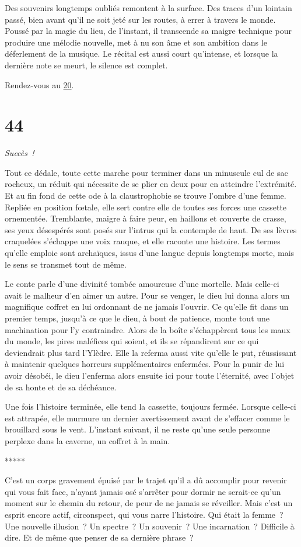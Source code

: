 \documentclass{report}
\newcommand{\gsection}[1]{
    \section{#1}
    \label{section-#1}
}
\newcommand{\glink}[1]{\hyperref[section-#1]{#1}}
\newcommand{\ellipse}{
    \begin{center}
        *****
    \end{center}
}
\newcommand{\success}{
    \emph{Succès !}
}
\begin{document}
Des souvenirs longtemps oubliés remontent à la surface. Des traces d'un lointain passé, bien avant qu'il ne soit jeté sur les routes, à errer à travers le monde. Poussé par la magie du lieu, de l'instant, il transcende sa maigre technique pour produire une mélodie nouvelle, met à nu son âme et son ambition dans le déferlement de la musique. Le récital est aussi court qu'intense, et lorsque la dernière note se meurt, le silence est complet.

Rendez-vous au \glink{20}.

\gsection{44}

\success

Tout ce dédale, toute cette marche pour terminer dans un minuscule cul de sac rocheux, un réduit qui nécessite de se plier en deux pour en atteindre l'extrémité. Et au fin fond de cette ode à la claustrophobie se trouve l'ombre d'une femme. Repliée en position fœtale, elle sert contre elle de toutes ses forces une cassette ornementée. Tremblante, maigre à faire peur, en haillons et couverte de crasse, ses yeux désespérés sont posés sur l'intrus qui la contemple de haut. De ses lèvres craquelées s'échappe une voix rauque, et elle raconte une histoire. Les termes qu'elle emploie sont archaïques, issus d'une langue depuis longtemps morte, mais le sens se transmet tout de même.

Le conte parle d'une divinité tombée amoureuse d'une mortelle. Mais celle-ci avait le malheur d'en aimer un autre. Pour se venger, le dieu lui donna alors un magnifique coffret en lui ordonnant de ne jamais l'ouvrir. Ce qu'elle fit dans un premier temps, jusqu'à ce que le dieu, à bout de patience, monte tout une machination pour l'y contraindre. Alors de la boîte s'échappèrent tous les maux du monde, les pires maléfices qui soient, et ils se répandirent sur ce qui deviendrait plus tard l'Ylèdre. Elle la referma aussi vite qu'elle le put, réussissant à maintenir quelques horreurs supplémentaires enfermées. Pour la punir de lui avoir désobéi, le dieu l'enferma alors ensuite ici pour toute l'éternité, avec l'objet de sa honte et de sa déchéance.

Une fois l'histoire terminée, elle tend la cassette, toujours fermée. Lorsque celle-ci est attrapée, elle murmure un dernier avertissement avant de s'effacer comme le brouillard sous le vent. L'instant suivant, il ne reste qu'une seule personne perplexe dans la caverne, un coffret à la main.

\ellipse

C'est un corps gravement épuisé par le trajet qu'il a dû accomplir pour revenir qui vous fait face, n'ayant jamais osé s'arrêter pour dormir ne serait-ce qu'un moment sur le chemin du retour, de peur de ne jamais se réveiller. Mais c'est un esprit encore actif, circonspect, qui vous narre l'histoire. Qui était la femme ? Une nouvelle illusion ? Un spectre ? Un souvenir ? Une incarnation ? Difficile à dire. Et de même que penser de sa dernière phrase ?
\end{document}
